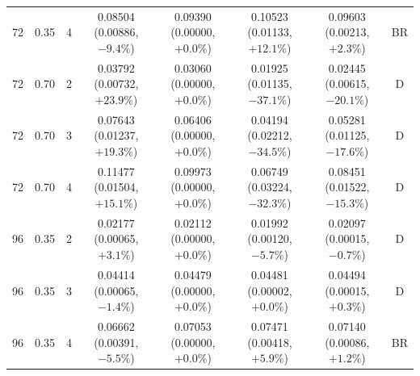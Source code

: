 \begin{longtable}{rrrccccc}
72 & 0.35 & 4 & \shortstack{0.08504\\(0.00886, $-9.4\%$)} & \shortstack{0.09390\\(0.00000, $+0.0\%$)} & \shortstack{0.10523\\(0.01133, $+12.1\%$)} & \shortstack{0.09603\\(0.00213, $+2.3\%$)} & BR \\
72 & 0.70 & 2 & \shortstack{0.03792\\(0.00732, $+23.9\%$)} & \shortstack{0.03060\\(0.00000, $+0.0\%$)} & \shortstack{0.01925\\(0.01135, $-37.1\%$)} & \shortstack{0.02445\\(0.00615, $-20.1\%$)} & D \\
72 & 0.70 & 3 & \shortstack{0.07643\\(0.01237, $+19.3\%$)} & \shortstack{0.06406\\(0.00000, $+0.0\%$)} & \shortstack{0.04194\\(0.02212, $-34.5\%$)} & \shortstack{0.05281\\(0.01125, $-17.6\%$)} & D \\
72 & 0.70 & 4 & \shortstack{0.11477\\(0.01504, $+15.1\%$)} & \shortstack{0.09973\\(0.00000, $+0.0\%$)} & \shortstack{0.06749\\(0.03224, $-32.3\%$)} & \shortstack{0.08451\\(0.01522, $-15.3\%$)} & D \\
96 & 0.35 & 2 & \shortstack{0.02177\\(0.00065, $+3.1\%$)} & \shortstack{0.02112\\(0.00000, $+0.0\%$)} & \shortstack{0.01992\\(0.00120, $-5.7\%$)} & \shortstack{0.02097\\(0.00015, $-0.7\%$)} & D \\
96 & 0.35 & 3 & \shortstack{0.04414\\(0.00065, $-1.4\%$)} & \shortstack{0.04479\\(0.00000, $+0.0\%$)} & \shortstack{0.04481\\(0.00002, $+0.0\%$)} & \shortstack{0.04494\\(0.00015, $+0.3\%$)} & D \\
96 & 0.35 & 4 & \shortstack{0.06662\\(0.00391, $-5.5\%$)} & \shortstack{0.07053\\(0.00000, $+0.0\%$)} & \shortstack{0.07471\\(0.00418, $+5.9\%$)} & \shortstack{0.07140\\(0.00086, $+1.2\%$)} & BR \\

\end{longtable}

